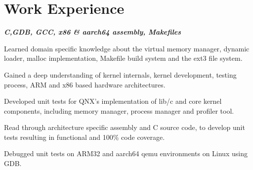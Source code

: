 \documentclass[letterpaper, 10pt]{deedy-resume} %
\begin{document}
{\begin{minipage}[t]{0.30\textwidth}
\sectionspace
\sectionspace
\sectionspace
\end{minipage}} \hspace{.5cm}%
%
%
\begin{minipage}[t]{0.65\textwidth} %

\vspace{1mm} \section{Work Experience}

\textit{\bf{C,GDB, GCC, x86 \& aarch64 assembly, Makefiles}}
\vspace{\topsep}
\vspace{\topsep} %
\begin{tightitemize}
\item Learned domain specific knowledge about the virtual memory manager, dynamic loader, malloc implementation, Makefile build system and the ext3 file system.
\item Gained a deep understanding of kernel internals, kernel development, testing process, ARM and x86 based hardware architectures. 
\item Developed unit tests for QNX's implementation of lib/c and core kernel components, including memory manager, process manager and profiler tool. 
\item Read through architecture specific assembly and C source code, to develop unit tests resulting in functional and 100\% code coverage.
\item Debugged unit tests on ARM32 and aarch64 qemu environments on Linux using GDB.
\end{tightitemize}
\sectionspace 


\end{minipage}
\end{document}
